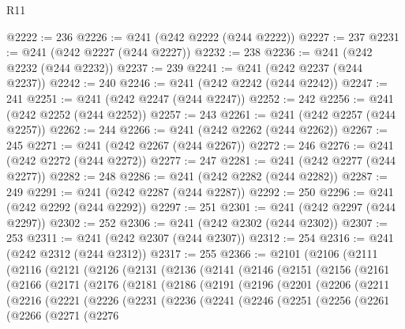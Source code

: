 \begin{lexlean}{R11}
\begin{coremodule}
{{{{{{{{{{{{{{{{{{{{{{{{{{{{{{{{{{{{{{{{{{{{{{{{{{{{{{{{{{{{{{{{{{{{{{{{{{{{{{{{{{{{{{{{{{{{{{{{{{{{{{{{{{@2222 := 236
@2226 := @241 (@242 @2222 (@244 @2222))
@2227 := 237
@2231 := @241 (@242 @2227 (@244 @2227))
@2232 := 238
@2236 := @241 (@242 @2232 (@244 @2232))
@2237 := 239
@2241 := @241 (@242 @2237 (@244 @2237))
@2242 := 240
@2246 := @241 (@242 @2242 (@244 @2242))
@2247 := 241
@2251 := @241 (@242 @2247 (@244 @2247))
@2252 := 242
@2256 := @241 (@242 @2252 (@244 @2252))
@2257 := 243
@2261 := @241 (@242 @2257 (@244 @2257))
@2262 := 244
@2266 := @241 (@242 @2262 (@244 @2262))
@2267 := 245
@2271 := @241 (@242 @2267 (@244 @2267))
@2272 := 246
@2276 := @241 (@242 @2272 (@244 @2272))
@2277 := 247
@2281 := @241 (@242 @2277 (@244 @2277))
@2282 := 248
@2286 := @241 (@242 @2282 (@244 @2282))
@2287 := 249
@2291 := @241 (@242 @2287 (@244 @2287))
@2292 := 250
@2296 := @241 (@242 @2292 (@244 @2292))
@2297 := 251
@2301 := @241 (@242 @2297 (@244 @2297))
@2302 := 252
@2306 := @241 (@242 @2302 (@244 @2302))
@2307 := 253
@2311 := @241 (@242 @2307 (@244 @2307))
@2312 := 254
@2316 := @241 (@242 @2312 (@244 @2312))
@2317 := 255
@2366 := @2101
    (@2106
      (@2111
        (@2116
          (@2121
            (@2126
              (@2131
                (@2136
                  (@2141
                    (@2146
                      (@2151
                        (@2156
                          (@2161
                            (@2166
                              (@2171
                                (@2176
                                  (@2181
                                    (@2186
                                      (@2191
                                        (@2196
                                          (@2201
                                            (@2206
                                              (@2211
                                                (@2216
                                                  (@2221
                                                    (@2226
                                                      (@2231
                                                        (@2236
                                                          (@2241
                                                            (@2246
                                                              (@2251
                                                                (@2256
                                                                  (@2261
                                                                    (@2266
                                                                      (@2271
                                                                        (@2276
}}}}}}}}}}}}}}}}}}}}}}}}}}}}}}}}}}}}}}}}}}}}}}}}}}}}}}}}}}}}}}}}}}}}}}}}}}}}}}}}}}}}}}}}}}}}}}}}}}}}}}}}}}
\end{coremodule}
\end{lexlean}
